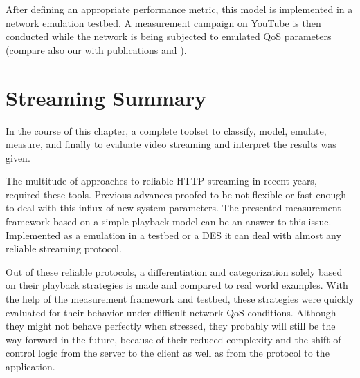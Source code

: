 After defining an appropriate performance metric, this model is implemented in a network emulation testbed. A measurement campaign on YouTube is then conducted while the network is being subjected to emulated \gls{QoS} parameters (compare also our with publications \cite{metzger2011delivery} and \cite{6229739}).















\section{Streaming Summary}
\label{c3:conclusion}

In the course of this chapter, a complete toolset to classify, model, emulate, measure, and finally to evaluate video streaming and interpret the results was given.

The multitude of approaches to reliable \gls{HTTP} streaming in recent years, required these tools. Previous advances proofed to be not flexible or fast enough to deal with this influx of new system parameters. The presented measurement framework based on a simple playback model can be an answer to this issue. Implemented as a emulation in a testbed or a \gls{DES} it can deal with almost any reliable streaming protocol.

Out of these reliable protocols, a differentiation and categorization solely based on their playback strategies is made and compared to real world examples. With the help of the measurement framework and testbed, these strategies were quickly evaluated for their behavior under difficult network \gls{QoS} conditions. Although they might not behave perfectly when stressed, they probably will still be the way forward in the future, because of their reduced complexity and the shift of control logic from the server to the client as well as from the protocol to the application.

